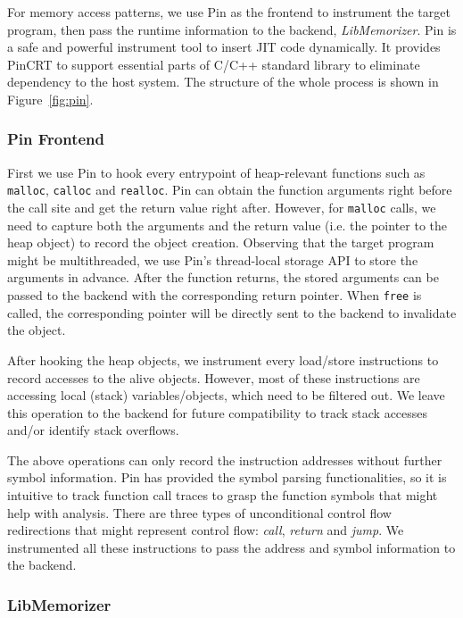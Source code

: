 \documentclass[letterpaper,twocolumn,10pt]{article}
\begin{document}
For memory access patterns, we use Pin as the frontend to instrument the target program, then pass the runtime information to the backend, \textit{LibMemorizer}.
Pin is a safe and powerful instrument tool to insert JIT code dynamically.
It provides PinCRT to support essential parts of C/C++ standard library to eliminate dependency to the host system.
The structure of the whole process is shown in Figure~\ref{fig:pin}.

\subsubsection{Pin Frontend}

First we use Pin to hook every entrypoint of heap-relevant functions such as \texttt{malloc}, \texttt{calloc} and \texttt{realloc}.
Pin can obtain the function arguments right before the call site and get the return value right after.
However, for \texttt{malloc} calls, we need to capture both the arguments and the return value (i.e. the pointer to the heap object) to record the object creation.
Observing that the target program might be multithreaded, we use Pin's thread-local storage API to store the arguments in advance.
After the function returns, the stored arguments can be passed to the backend with the corresponding return pointer.
When \texttt{free} is called, the corresponding pointer will be directly sent to the backend to invalidate the object.

After hooking the heap objects, we instrument every load/store instructions to record accesses to the alive objects.
However, most of these instructions are accessing local (stack) variables/objects, which need to be filtered out.
We leave this operation to the backend for future compatibility to track stack accesses and/or identify stack overflows.

The above operations can only record the instruction addresses without further symbol information. 
Pin has provided the symbol parsing functionalities, so it is intuitive to track function call traces to grasp the function symbols that might help with analysis.
There are three types of unconditional control flow redirections that might represent control flow: \textit{call}, \textit{return} and \textit{jump}.
We instrumented all these instructions to pass the address and symbol information to the backend.

\subsubsection{LibMemorizer}
\end{document}

